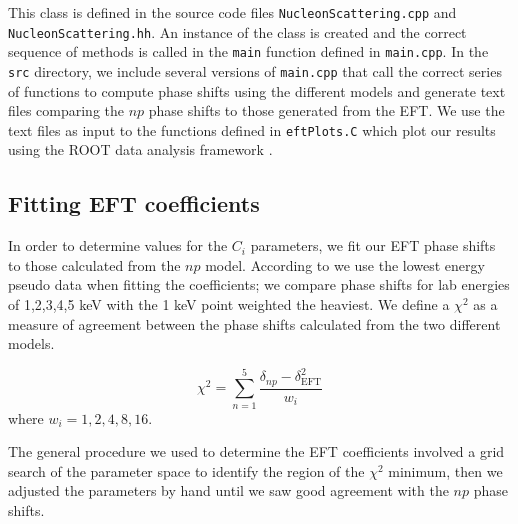 \documentclass[10pt,showpacs,preprintnumbers,footinbib,amsmath,amssymb,aps,prl,twocolumn,groupedaddress,superscriptaddress,showkeys]{revtex4-1}
\begin{document}
This class is defined in the source code files \texttt{NucleonScattering.cpp} and
\texttt{NucleonScattering.hh}. An instance of the class is created and the correct sequence of
methods is called in the \texttt{main} function defined in \texttt{main.cpp}. In the \texttt{src}
directory, we include several versions of \texttt{main.cpp} that call the correct series of
functions to compute phase shifts using the different models and generate text files comparing
the $np$ phase shifts to those generated from the EFT. We use the text files as input to
the functions defined in \texttt{eftPlots.C} which plot our results using the ROOT data analysis
framework \citep{Brun:1997}.


\subsection{Fitting EFT coefficients}

In order to determine values for the $C_i$ parameters, we fit our EFT phase shifts to those
calculated from the $np$ model. According to \citet{Lepage} we use the lowest energy
pseudo data when fitting the coefficients; we compare phase shifts for lab energies of
1,2,3,4,5 keV with the 1 keV point weighted the heaviest. We define a $\chi^2$ as a
measure of agreement between the phase shifts calculated from the two different models.

\begin{equation}
	\chi^2 = \sum_{n=1}^{5} \frac{\delta _{np} - \delta _{\mathrm{EFT}}^2}{w_i}
\end{equation}
where $w_i = {1,2,4,8,16}$.

The general procedure we used to determine the EFT coefficients involved a grid search
of the parameter space to identify the region of the $\chi^2$ minimum, then we adjusted
the parameters by hand until we saw good agreement with the $np$ phase shifts.





\end{document}
